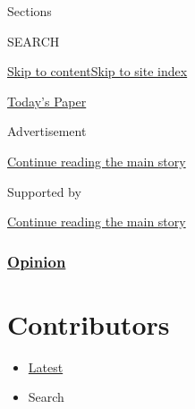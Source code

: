 Sections

SEARCH

\protect\hyperlink{site-content}{Skip to
content}\protect\hyperlink{site-index}{Skip to site index}

\href{https://myaccount.nytimes.com/auth/login?response_type=cookie\&client_id=vi}{}

\href{https://www.nytimes.com/section/todayspaper}{Today's Paper}

Advertisement

\protect\hyperlink{after-top}{Continue reading the main story}

Supported by

\protect\hyperlink{after-sponsor}{Continue reading the main story}

\hypertarget{opinion}{%
\subsubsection{\texorpdfstring{\href{/section/opinion}{Opinion}}{Opinion}}\label{opinion}}

\hypertarget{contributors}{%
\section{Contributors}\label{contributors}}

\begin{itemize}
\tightlist
\item
  \protect\hyperlink{stream-panel}{Latest}
\item
  Search
\end{itemize}

